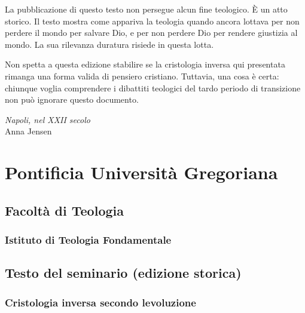 \documentclass[
]{article}
\begin{document}
La pubblicazione di questo testo non persegue alcun fine teologico. È un atto storico. Il testo mostra come appariva la teologia quando ancora lottava per non perdere il mondo per salvare Dio, e per non perdere Dio per rendere giustizia al mondo. La sua rilevanza duratura risiede in questa lotta.

Non spetta a questa edizione stabilire se la cristologia inversa qui presentata rimanga una forma valida di pensiero cristiano. Tuttavia, una cosa è certa: chiunque voglia comprendere i dibattiti teologici del tardo periodo di transizione non può ignorare questo documento.

\emph{Napoli, nel XXII secolo\\
}Anna Jensen

\section{\texorpdfstring{\hfill\break
}{ }}\label{section-3}

\section{\texorpdfstring{\textbf{Pontificia Università Gregoriana}}{Pontificia Università Gregoriana}}\label{pontificia-universituxe0-gregoriana}

\subsection{\texorpdfstring{\textbf{Facoltà di Teologia}}{Facoltà di Teologia}}\label{facoltuxe0-di-teologia}

\subsubsection{\texorpdfstring{\textbf{Istituto di Teologia Fondamentale}}{Istituto di Teologia Fondamentale}}\label{istituto-di-teologia-fondamentale}

\subsection{\texorpdfstring{\textbf{Testo del seminario (edizione storica)}}{Testo del seminario (edizione storica)}}\label{testo-del-seminario-edizione-storica}

\subsubsection{\texorpdfstring{\textbf{Cristologia inversa secondo l\textquotesingle evoluzione}}{Cristologia inversa secondo l\textquotesingle evoluzione}}\label{cristologia-inversa-secondo-levoluzione}
\end{document}
